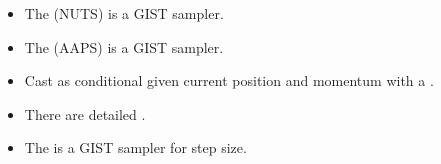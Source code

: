 \documentclass[10pt]{report}
\begin{document}




\begin{itemize}
\item The  (NUTS) is a GIST sampler.
\item The  (AAPS) is a GIST sampler.
\item Cast as conditional  given
  current position and momentum with a .
\item There are detailed .
\item The  is a GIST sampler for step size. 
\end{itemize}
\end{document}
